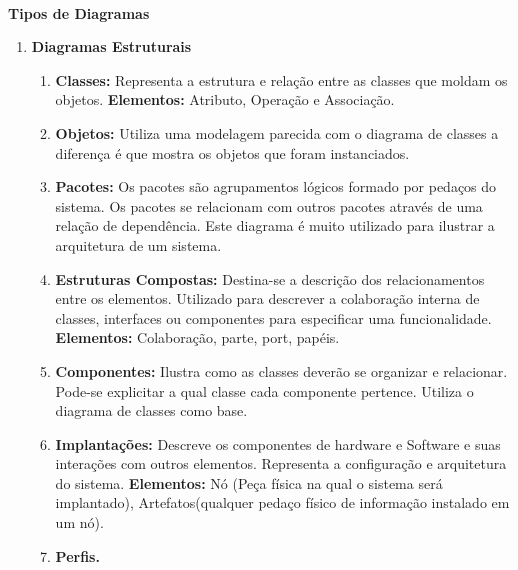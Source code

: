 \documentclass[12pt, a4paper]{article}
\begin{document}
\noindent
\textbf{\\Tipos de Diagramas}
\begin{enumerate}[label*=\textbf{\arabic*}.]

    \item \textbf{Diagramas Estruturais}
        \begin{enumerate}[label*=\textbf{\arabic*}.]
            \item \textbf{Classes:} Representa a estrutura e relação entre as classes
            que moldam os objetos. \textbf{Elementos:} Atributo, Operação e Associação.

            \item \textbf{Objetos:} Utiliza uma modelagem parecida com o diagrama de classes
            a diferença é que mostra os objetos que foram instanciados.

            \item \textbf{Pacotes:} Os pacotes são agrupamentos lógicos formado por pedaços
            do sistema.  Os pacotes se relacionam com outros pacotes através de uma relação de dependência.
            Este diagrama é muito utilizado para ilustrar a arquitetura de um sistema.

            \item \textbf{Estruturas Compostas:} Destina-se a descrição dos relacionamentos entre os elementos. 
            Utilizado para descrever a colaboração interna de classes, interfaces ou 
            componentes para especificar uma funcionalidade. \textbf{Elementos:} Colaboração, parte, port, papéis.

            \item \textbf{Componentes:} Ilustra como as classes deverão se organizar e relacionar. 
            Pode-se explicitar a qual classe cada componente pertence. Utiliza o diagrama de classes como base.

            \item \textbf{Implantações:} Descreve os componentes de hardware e Software
            e suas interações com outros elementos. Representa a configuração e arquitetura
            do sistema. \textbf{Elementos:} Nó (Peça física na qual o sistema será implantado), Artefatos(qualquer pedaço físico de informação instalado em um nó).
            
            \item \textbf{Perfis.}
        
        \end{enumerate}


\end{enumerate}
\end{document}
